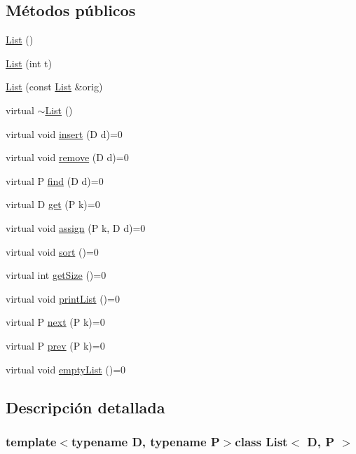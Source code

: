 \subsection*{Métodos públicos}
\begin{DoxyCompactItemize}
\item 
\hyperlink{class_list_a3deb54ab4f51c6c39aa4015f258b5812}{List} ()
\item 
\hyperlink{class_list_ad4d8108cecffb02dbc5e5e48691a0d43}{List} (int t)
\item 
\hyperlink{class_list_af8bcd7dae1bc30af2158075482c3d8d9}{List} (const \hyperlink{class_list}{List} \&orig)
\item 
virtual \hyperlink{class_list_a624593fb77847bf7ad4cacfba3442471}{$\sim$\-List} ()
\item 
virtual void \hyperlink{class_list_a01f588d87d47f8332928eca38f7b11bb}{insert} (D d)=0
\item 
virtual void \hyperlink{class_list_a14fc4e853102018df78db3899aa00d71}{remove} (D d)=0
\item 
virtual P \hyperlink{class_list_a2b40d6fffc7b2fb5138b648f52c839ee}{find} (D d)=0
\item 
virtual D \hyperlink{class_list_a5bd565e668247ae0691983227367cc88}{get} (P k)=0
\item 
virtual void \hyperlink{class_list_acb062aa988f4048498b30a2d845a311b}{assign} (P k, D d)=0
\item 
virtual void \hyperlink{class_list_ae3795939f27cf3e688cd470450e0c27a}{sort} ()=0
\item 
virtual int \hyperlink{class_list_af213bbcf13ee436a0f04cde66e337672}{get\-Size} ()=0
\item 
virtual void \hyperlink{class_list_a8b34931e187e7e6b86aad86510ce4f3b}{print\-List} ()=0
\item 
virtual P \hyperlink{class_list_a4ec3e88e176bb45bc49b030d1c8abb3f}{next} (P k)=0
\item 
virtual P \hyperlink{class_list_acc1831ae92a288345ef20cb29f3846b2}{prev} (P k)=0
\item 
virtual void \hyperlink{class_list_a24b4f177a70215980e81ef7b2981fa1e}{empty\-List} ()=0
\end{DoxyCompactItemize}


\subsection{Descripción detallada}
\subsubsection*{template$<$typename D, typename P$>$class List$<$ D, P $>$}

